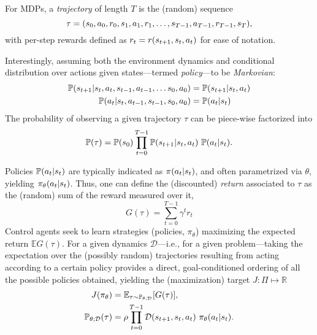 For MDPs, a \emph{trajectory} of length \(T\) is the (random) sequence
\begin{equation}\label{eq:trajectory_definition}
    \tau = (s_0, a_0, r_0, s_1, a_1, r_1, \dots, s_{T-1}, a_{T-1}, r_{T-1}, s_T),
\end{equation}
with per-step rewards defined as \(r_t = r (s_{t+1}, s_t, a_t) \) for ease of notation.

Interestingly, assuming both the environment dynamics and conditional distribution over actions given states---termed \emph{policy}---to be \emph{Markovian}:
%
\begin{align}
\mathbb P(s_{t+1} \vert s_t, a_t, s_{t-1}, a_{t-1}, \dots s_0, a_0 ) &= \mathbb P (s_{t+1} \vert s_t, a_t) \label{eq:dynamics_markovian} \\
\mathbb P(a_t \vert s_t, a_{t-1}, s_{t-1}, s_0, a_0) &= \mathbb P(a_t \vert s_t) \label{eq:policy_markovian}
\end{align}
%
The probability of observing a given trajectory \( \tau \) can be piece-wise factorized into
\begin{equation}\label{eq:traj_prob}
    \mathbb P(\tau) = \mathbb P (s_0) \prod_{t=0}^{T-1} \mathbb P (s_{t+1} \vert s_t, a_t) \ \mathbb P(a_t \vert s_t).
\end{equation}

Policies \( \mathbb P(a_t \vert s_t) \) are typically indicated as \( \pi(a_t \vert s_t) \), and often parametrized via \( \theta \), yielding \( \pi_\theta (a_t \vert s_t )\).
Thus, one can define the (discounted) \emph{return} associated to \( \tau \) as the (random) sum of the reward measured over it,
\[
    G(\tau) = \sum_{t=0}^{T-1} \gamma^{t} r_t
\]
Control agents seek to learn strategies (policies, \( \pi_\theta \)) maximizing the expected return \( \mathbb E G(\tau) \). 
For a given dynamics \( \mathcal D \)---i.e., for a given problem---taking the expectation over the (possibly random) trajectories resulting from acting according to a certain policy provides a direct, goal-conditioned ordering of all the possible policies obtained, yielding the (maximization) target \( J : \Pi \mapsto \mathbb R \)
\begin{align}
    J(\pi_\theta) &= \mathbb E_{\tau \sim \mathbb P_{\theta; \mathcal D}} \left[ G(\tau) \right], \label{eq:RL-j-function} \\
    \mathbb P_{\theta; \mathcal D} (\tau) &= \rho \prod_{t=0}^{T-1} \mathcal D \transition \ \pi_\theta (\action \vert \state).\label{eq:traj-probabilities-for-policies}
\end{align}

